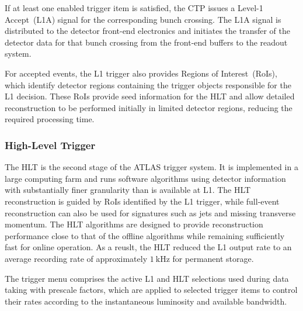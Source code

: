 If at least one enabled trigger item is satisfied, the CTP issues a Level-1 Accept~(L1A) signal for the corresponding bunch crossing.
The L1A signal is distributed to the detector front-end electronics and initiates the transfer of the detector data for that bunch crossing from the front-end buffers to the readout system.

For accepted events, the L1 trigger also provides Regions of Interest~(RoIs), which identify detector regions containing the trigger objects responsible for the L1 decision.
These RoIs provide seed information for the HLT and allow detailed reconstruction to be performed initially in limited detector regions, reducing the required processing time.

\subsubsection*{High-Level Trigger}

The HLT is the second stage of the ATLAS trigger system.
It is implemented in a large computing farm and runs software algorithms using detector information with substantially finer granularity than is available at L1.
The HLT reconstruction is guided by RoIs identified by the L1 trigger, while full-event reconstruction can also be used for signatures such as jets and missing transverse momentum.
The HLT algorithms are designed to provide reconstruction performance close to that of the offline algorithms while remaining sufficiently fast for online operation.
As a reuslt, the HLT reduced the L1 output rate to an average recording rate of approximately $1~\mathrm{kHz}$ for permanent storage.

The trigger menu comprises the active L1 and HLT selections used during data taking with prescale factors, which are applied to selected trigger items to control their rates according to the instantaneous luminosity and available bandwidth.
